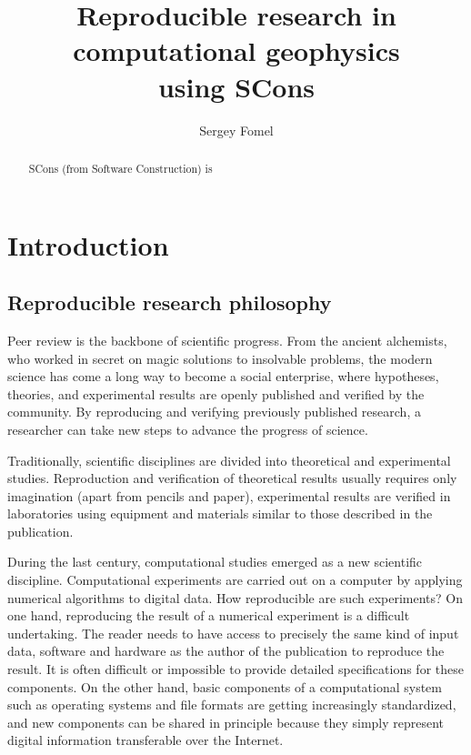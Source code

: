 \title{Reproducible research in computational geophysics \\ using SCons}

\author{Sergey Fomel}

\maketitle

\begin{abstract}
SCons (from Software Construction) is
\end{abstract}

\section{Introduction}

\subsection{Reproducible research philosophy}

Peer review is the backbone of scientific progress. From the ancient
alchemists, who worked in secret on magic solutions to insolvable
problems, the modern science has come a long way to become a social
enterprise, where hypotheses, theories, and experimental results are
openly published and verified by the community. By reproducing and
verifying previously published research, a researcher can take new
steps to advance the progress of science.

Traditionally, scientific disciplines are divided into theoretical and
experimental studies. Reproduction and verification of theoretical
results usually requires only imagination (apart from pencils and
paper), experimental results are verified in laboratories using
equipment and materials similar to those described in the publication.

During the last century, computational studies emerged as a new
scientific discipline. Computational experiments are carried out on a
computer by applying numerical algorithms to digital data. How
reproducible are such experiments? On one hand, reproducing the result
of a numerical experiment is a difficult undertaking. The reader needs
to have access to precisely the same kind of input data, software and
hardware as the author of the publication to reproduce the result. It
is often difficult or impossible to provide detailed specifications
for these components. On the other hand, basic components of a
computational system such as operating systems and file formats are
getting increasingly standardized, and new components can be shared in
principle because they simply represent digital information
transferable over the Internet.

